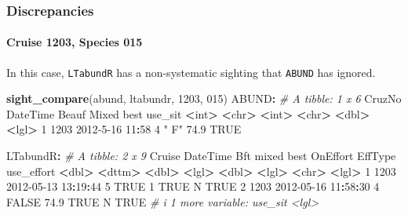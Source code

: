 \documentclass[
]{book}
\newenvironment{Shaded}{\begin{snugshade}}{\end{snugshade}}
\newcommand{\CommentTok}[1]{\textcolor[rgb]{0.56,0.35,0.01}{\textit{#1}}}
\newcommand{\ConstantTok}[1]{\textcolor[rgb]{0.56,0.35,0.01}{#1}}
\newcommand{\DecValTok}[1]{\textcolor[rgb]{0.00,0.00,0.81}{#1}}
\newcommand{\ErrorTok}[1]{\textcolor[rgb]{0.64,0.00,0.00}{\textbf{#1}}}
\newcommand{\FloatTok}[1]{\textcolor[rgb]{0.00,0.00,0.81}{#1}}
\newcommand{\FunctionTok}[1]{\textcolor[rgb]{0.13,0.29,0.53}{\textbf{#1}}}
\newcommand{\NormalTok}[1]{#1}
\newcommand{\SpecialCharTok}[1]{\textcolor[rgb]{0.81,0.36,0.00}{\textbf{#1}}}
\newcommand{\StringTok}[1]{\textcolor[rgb]{0.31,0.60,0.02}{#1}}
\begin{document}
\hypertarget{discrepancies}{%
\subsubsection*{Discrepancies}\label{discrepancies}}

\hypertarget{cruise-1203-species-015}{%
\paragraph*{Cruise 1203, Species 015}\label{cruise-1203-species-015}}

In this case, \texttt{LTabundR} has a non-systematic sighting that \texttt{ABUND} has ignored.

\begin{Shaded}
\begin{Highlighting}[]
\FunctionTok{sight\_compare}\NormalTok{(abund, ltabundr, }\DecValTok{1203}\NormalTok{, }\StringTok{\textquotesingle{}015\textquotesingle{}}\NormalTok{)}
\NormalTok{ABUND}\SpecialCharTok{:}
\CommentTok{\# A tibble: 1 x 6}
\NormalTok{  CruzNo DateTime        Beauf Mixed  best use\_sit}
   \SpecialCharTok{\textless{}}\NormalTok{int}\SpecialCharTok{\textgreater{}} \ErrorTok{\textless{}}\NormalTok{chr}\SpecialCharTok{\textgreater{}}           \ErrorTok{\textless{}}\NormalTok{int}\SpecialCharTok{\textgreater{}} \ErrorTok{\textless{}}\NormalTok{chr}\SpecialCharTok{\textgreater{}} \ErrorTok{\textless{}}\NormalTok{dbl}\SpecialCharTok{\textgreater{}} \ErrorTok{\textless{}}\NormalTok{lgl}\SpecialCharTok{\textgreater{}}  
\DecValTok{1}   \DecValTok{1203} \DecValTok{2012{-}5{-}16} \DecValTok{11}\SpecialCharTok{:}\DecValTok{58}     \DecValTok{4} \StringTok{" F"}   \FloatTok{74.9} \ConstantTok{TRUE}   

\NormalTok{LTabundR}\SpecialCharTok{:}
\CommentTok{\# A tibble: 2 x 9}
\NormalTok{  Cruise DateTime              Bft mixed  best OnEffort EffType use\_effort}
   \SpecialCharTok{\textless{}}\NormalTok{dbl}\SpecialCharTok{\textgreater{}} \ErrorTok{\textless{}}\NormalTok{dttm}\SpecialCharTok{\textgreater{}}              \ErrorTok{\textless{}}\NormalTok{dbl}\SpecialCharTok{\textgreater{}} \ErrorTok{\textless{}}\NormalTok{lgl}\SpecialCharTok{\textgreater{}} \ErrorTok{\textless{}}\NormalTok{dbl}\SpecialCharTok{\textgreater{}} \ErrorTok{\textless{}}\NormalTok{lgl}\SpecialCharTok{\textgreater{}}    \ErrorTok{\textless{}}\NormalTok{chr}\SpecialCharTok{\textgreater{}}   \ErrorTok{\textless{}}\NormalTok{lgl}\SpecialCharTok{\textgreater{}}     
\DecValTok{1}   \DecValTok{1203} \DecValTok{2012{-}05{-}13} \DecValTok{13}\SpecialCharTok{:}\DecValTok{19}\SpecialCharTok{:}\DecValTok{44}     \DecValTok{5} \ConstantTok{TRUE}    \DecValTok{1}   \ConstantTok{TRUE}\NormalTok{     N       }\ConstantTok{TRUE}      
\DecValTok{2}   \DecValTok{1203} \DecValTok{2012{-}05{-}16} \DecValTok{11}\SpecialCharTok{:}\DecValTok{58}\SpecialCharTok{:}\DecValTok{30}     \DecValTok{4} \ConstantTok{FALSE}  \FloatTok{74.9} \ConstantTok{TRUE}\NormalTok{     N       }\ConstantTok{TRUE}      
\CommentTok{\# i 1 more variable: use\_sit \textless{}lgl\textgreater{}}
\end{Highlighting}
\end{Shaded}
\end{document}
